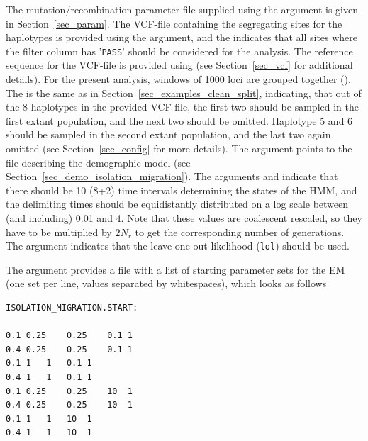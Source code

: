 \documentclass{article}
\numberwithin{equation}{section}
\begin{document}
The mutation/recombination parameter file supplied using the  argument is given in Section~\ref{sec_param}. The VCF-file containing the segregating sites for the haplotypes is provided using the  argument, and the  indicates that all sites where the filter column has '\texttt{PASS}' should be considered for the analysis. The reference sequence for the VCF-file is provided using  (see Section~\ref{sec_vcf} for additional details). For the present analysis, windows of 1000 loci are grouped together (). The  is the same as in Section~\ref{sec_examples_clean_split}, indicating, that out of the 8 haplotypes in the provided VCF-file, the first two should be sampled in the first extant population, and the next two should be omitted. Haplotype 5 and 6 should be sampled in the second extant population, and the last two again omitted (see Section~\ref{sec_config} for more details). The argument  points to the file describing the demographic model (see Section~\ref{sec_demo_isolation_migration}). The arguments  and  indicate that there should be 10 (8+2) time intervals determining the states of the HMM, and the delimiting times should be equidistantly distributed on a log scale between (and including) 0.01 and 4. Note that these values are coalescent rescaled, so they have to be multiplied by $2N_r$ to get the corresponding number of generations. The argument  indicates that the leave-one-out-likelihood (\texttt{lol}) should be used.

The argument  provides a file with a list of starting parameter sets for the EM (one set per line, values separated by whitespaces), which looks as follows

\begin{verbatim}
ISOLATION_MIGRATION.START:

0.1	0.25	0.25	0.1	1
0.4	0.25	0.25	0.1	1
0.1	1	1	0.1	1
0.4	1	1	0.1	1
0.1	0.25	0.25	10	1
0.4	0.25	0.25	10	1
0.1	1	1	10	1
0.4	1	1	10	1
\end{verbatim}
\end{document}
